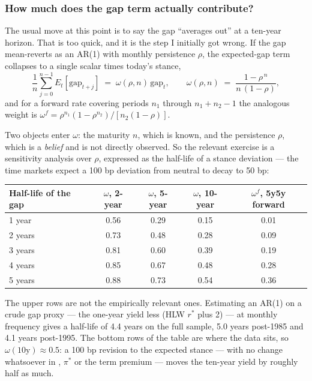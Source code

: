 \subsubsection*{How much does the gap term actually contribute?}

The usual move at this point is to say the gap ``averages out'' at a ten-year horizon. That
is too quick, and it is the step I initially got wrong. If the gap mean-reverts as an AR(1)
with monthly persistence $\rho$, the expected-gap term collapses to a single scalar times
today's stance,
\begin{equation}
\frac{1}{n}\sum_{j=0}^{n-1} E_t\!\left[\text{gap}_{t+j}\right]
\;=\; \omega(\rho,n)\,\text{gap}_t ,
\qquad
\omega(\rho,n) \;=\; \frac{1-\rho^{\,n}}{n\,(1-\rho)} ,
\label{eq:omega}
\end{equation}
and for a forward rate covering periods $n_1$ through $n_1+n_2-1$ the analogous weight is
$\omega^{f} = \rho^{n_1}\left(1-\rho^{n_2}\right)\big/\left[n_2(1-\rho)\right]$.

Two objects enter $\omega$: the maturity $n$, which is known, and the persistence $\rho$,
which is a \emph{belief} and is not directly observed. So the relevant exercise is a
sensitivity analysis over $\rho$, expressed as the half-life of a stance deviation --- the
time markets expect a 100 bp deviation from neutral to decay to 50 bp:

\begin{center}\small
\begin{tabular}{lcccc}
\toprule
Half-life of the gap & $\omega$, 2-year & $\omega$, 5-year & $\omega$, 10-year & $\omega^{f}$, 5y5y forward\\ \midrule
1 year  & 0.56 & 0.29 & 0.15 & 0.01\\
2 years & 0.73 & 0.48 & 0.28 & 0.09\\
3 years & 0.81 & 0.60 & 0.39 & 0.19\\
4 years & 0.85 & 0.67 & 0.48 & 0.28\\
5 years & 0.88 & 0.73 & 0.54 & 0.36\\
\bottomrule\end{tabular}
\end{center}

\noindent The upper rows are not the empirically relevant ones. Estimating an AR(1) on a
crude gap proxy --- the one-year yield less (HLW $r^{*}$ plus 2) --- at monthly frequency gives
a half-life of 4.4 years on the full sample, 5.0 years post-1985 and 4.1 years post-1995. The
bottom rows of the table are where the data sits, so $\omega(10\text{y}) \approx 0.5$: a 100 bp
revision to the expected stance --- with no change whatsoever in \rs{}, $\pi^{*}$ or the term
premium --- moves the ten-year yield by roughly half as much.

